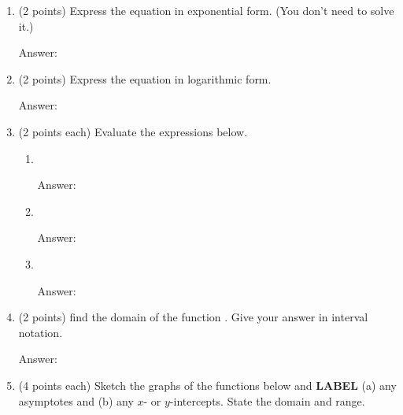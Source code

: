 \documentclass[11pt]{article}
\begin{document}
\newpage
\restoregeometry
\begin{enumerate}
\item (2 points) Express the equation \fbox{\scalebox{1.2}{$\log 3=2t $}} in exponential form. (You don't need to solve it.)\\
\begin{flushright}{ Answer:\underline{\hspace{2in}}}\end{flushright}
\vfill
\item (2 points) Express the equation  in logarithmic form.\\
\begin{flushright}{ Answer:\underline{\hspace{2in}}}\end{flushright}
\vfill
\item (2 points each) Evaluate the expressions below.
\begin{enumerate}
\item {}\\
\begin{flushright}{ Answer:\underline{\hspace{2in}}}\end{flushright}
\vfill
\item {}\\
\begin{flushright}{ Answer:\underline{\hspace{2in}}}\end{flushright}
\vfill
\item \scalebox{1.2}{$\log_4 8 $}\\
\begin{flushright}{ Answer:\underline{\hspace{2in}}}\end{flushright}
\vfill
\end{enumerate}
\item (2 points) find the domain of the function \scalebox{1.2}{$h(x)=\ln x + \ln (2-x)$}. Give your answer in interval notation.\\
\begin{flushright}{ Answer:\underline{\hspace{2in}}}\end{flushright}
\vfill
\newpage
\item (4 points each) Sketch the graphs of the functions below and {\bf{LABEL}} (a) any asymptotes and (b) any $x$- or $y$-intercepts. State the domain and range. 

\end{enumerate}
\end{document}
